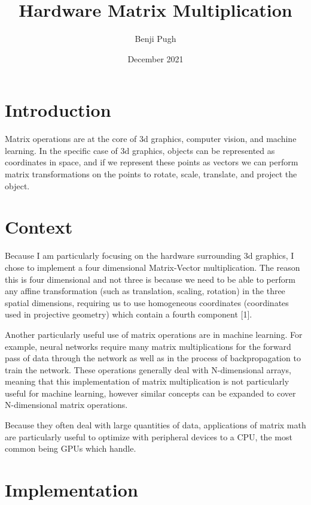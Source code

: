 \documentclass{article}
\title{Hardware Matrix Multiplication}
\author{Benji Pugh}
\date{December 2021}
\begin{document}
\maketitle

\section{Introduction}
Matrix operations are at the core of 3d graphics, computer vision, and machine learning. In the specific case of 3d graphics, objects can be represented as coordinates in space, and if we represent these points as vectors we can perform matrix transformations on the points to rotate, scale, translate, and project the object.

\section{Context}
Because I am particularly focusing on the hardware surrounding 3d graphics, I chose to implement a four dimensional Matrix-Vector multiplication. The reason this is four dimensional and not three is because we need to be able to perform any affine transformation (such as translation, scaling, rotation) in the three spatial dimensions, requiring us to use homogeneous coordinates (coordinates used in projective geometry) which contain a fourth component [1].

Another particularly useful use of matrix operations are in machine learning. For example, neural networks require many matrix multiplications for the forward pass of data through the network as well as in the process of backpropagation to train the network. These operations generally deal with N-dimensional arrays, meaning that this implementation of matrix multiplication is not particularly useful for machine learning, however similar concepts can be expanded to cover N-dimensional matrix operations.

Because they often deal with large quantities of data, applications of matrix math are particularly useful to optimize with peripheral devices to a CPU, the most common being GPUs which handle.

\section{Implementation}
\end{document}
